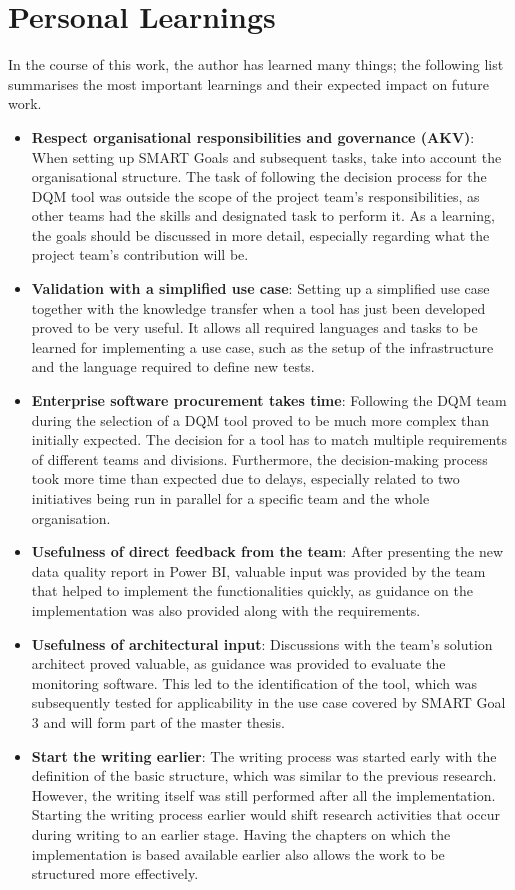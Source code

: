 \section{Personal Learnings}

In the course of this work, the author has learned many things; the following list summarises the most important learnings and their expected impact on future work.

\begin{itemize}
    \item \textbf{Respect organisational responsibilities and governance (AKV)}: When setting up SMART Goals and subsequent tasks, take into account the organisational structure. The task of following the decision process for the DQM tool was outside the scope of the project team's responsibilities, as other teams had the skills and designated task to perform it. As a learning, the goals should be discussed in more detail, especially regarding what the project team's contribution will be.
    \item \textbf{Validation with a simplified use case}: Setting up a simplified use case together with the knowledge transfer when a tool has just been developed proved to be very useful. It allows all required languages and tasks to be learned for implementing a use case, such as the setup of the infrastructure and the language required to define new tests.
    \item \textbf{Enterprise software procurement takes time}: Following the DQM team during the selection of a DQM tool proved to be much more complex than initially expected. The decision for a tool has to match multiple requirements of different teams and divisions. Furthermore, the decision-making process took more time than expected due to delays, especially related to two initiatives being run in parallel for a specific team and the whole organisation.
    \item \textbf{Usefulness of direct feedback from the team}: After presenting the new data quality report in Power BI, valuable input was provided by the team that helped to implement the functionalities quickly, as guidance on the implementation was also provided along with the requirements.
    \item \textbf{Usefulness of architectural input}: Discussions with the team's solution architect proved valuable, as guidance was provided to evaluate the monitoring software. This led to the identification of the tool, which was subsequently tested for applicability in the use case covered by SMART Goal 3 and will form part of the master thesis.
    \item \textbf{Start the writing earlier}: The writing process was started early with the definition of the basic structure, which was similar to the previous research. However, the writing itself was still performed after all the implementation. Starting the writing process earlier would shift research activities that occur during writing to an earlier stage. Having the chapters on which the implementation is based available earlier also allows the work to be structured more effectively.
\end{itemize}



